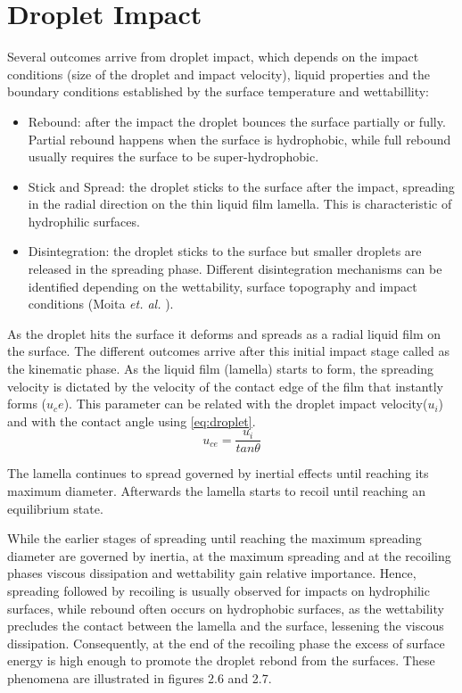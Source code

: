 \section{Droplet Impact}

\par Several outcomes arrive from droplet impact, which depends on the impact conditions (size of the droplet and impact velocity), liquid properties and the boundary conditions established by the surface temperature and wettabillity:

\begin{itemize}
\item Rebound: after the impact the droplet bounces the surface partially or fully. Partial rebound happens when the surface is hydrophobic, while full rebound usually requires the surface to be super-hydrophobic.
\item Stick and Spread: the droplet sticks to the surface after the impact, spreading in the radial direction on the thin liquid film lamella. This is characteristic of hydrophilic surfaces.
\item Disintegration: the droplet sticks to the surface but smaller droplets are released in the spreading phase. Different disintegration mechanisms can be identified depending on the wettability, surface topography and impact conditions (Moita \textit{et. al.} \cite{moita2007drop}).
\end{itemize}

\par As the droplet hits the surface it deforms and spreads as a radial liquid film on the surface. The different outcomes arrive after this initial impact stage called as the kinematic phase.
As the liquid film (lamella) starts to form, the spreading velocity is dictated by the velocity of the contact edge of the film that instantly forms ($u_ce$). This parameter can be related with the droplet impact velocity($u_i$) and with the contact angle using \ref{eq:droplet}.
\begin{equation} \label{eq:droplet}
u_{ce}=\frac{u_i}{tan \theta}
\end{equation}

\par The lamella continues to spread governed by inertial effects until reaching its maximum diameter. Afterwards the lamella starts to recoil until reaching an equilibrium state.\\

\par While the earlier stages of spreading until reaching the maximum spreading diameter are governed by inertia, at the maximum spreading and at the recoiling phases viscous dissipation and wettability gain relative importance. Hence, spreading followed by recoiling is usually observed for impacts on hydrophilic surfaces, while rebound often occurs on hydrophobic surfaces, as the wettability precludes the contact between the lamella and the surface, lessening the viscous dissipation. Consequently, at the end of the recoiling phase the excess of surface energy is high enough to promote the droplet rebond from the surfaces. These phenomena are illustrated in figures 2.6 and 2.7.\\

